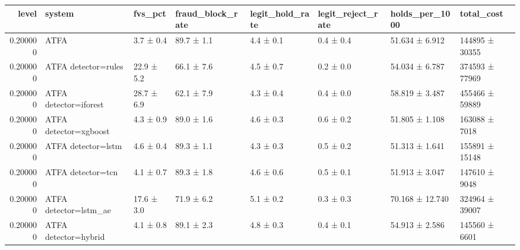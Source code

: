 \begin{tabular}{rlllllll}
\toprule
level & system & fvs\_pct & fraud\_block\_rate & legit\_hold\_rate & legit\_reject\_rate & holds\_per\_1000 & total\_cost \\
\midrule
0.200000 & ATFA & 3.7 ± 0.4 & 89.7 ± 1.1 & 4.4 ± 0.1 & 0.4 ± 0.4 & 51.634 ± 6.912 & 144895 ± 30355 \\
0.200000 & ATFA detector=rules & 22.9 ± 5.2 & 66.1 ± 7.6 & 4.5 ± 0.7 & 0.2 ± 0.0 & 54.034 ± 6.787 & 374593 ± 77969 \\
0.200000 & ATFA detector=iforest & 28.7 ± 6.9 & 62.1 ± 7.9 & 4.3 ± 0.4 & 0.4 ± 0.0 & 58.819 ± 3.487 & 455466 ± 59889 \\
0.200000 & ATFA detector=xgboost & 4.3 ± 0.9 & 89.0 ± 1.6 & 4.6 ± 0.3 & 0.6 ± 0.2 & 51.805 ± 1.108 & 163088 ± 7018 \\
0.200000 & ATFA detector=lstm & 4.6 ± 0.4 & 89.3 ± 1.1 & 4.3 ± 0.3 & 0.5 ± 0.2 & 51.313 ± 1.641 & 155891 ± 15148 \\
0.200000 & ATFA detector=tcn & 4.1 ± 0.7 & 89.3 ± 1.8 & 4.6 ± 0.6 & 0.5 ± 0.1 & 51.913 ± 3.047 & 147610 ± 9048 \\
0.200000 & ATFA detector=lstm\_ae & 17.6 ± 3.0 & 71.9 ± 6.2 & 5.1 ± 0.2 & 0.3 ± 0.3 & 70.168 ± 12.740 & 324964 ± 39007 \\
0.200000 & ATFA detector=hybrid & 4.1 ± 0.8 & 89.1 ± 2.3 & 4.8 ± 0.3 & 0.4 ± 0.1 & 54.913 ± 2.586 & 145560 ± 6601 \\
\bottomrule
\end{tabular}
